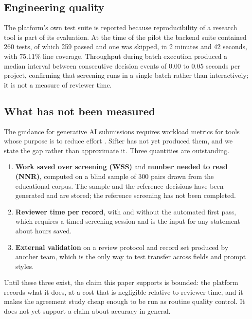 \subsection{Engineering quality}

The platform's own test suite is reported because reproducibility of a
research tool is part of its evaluation. At the time of the pilot the backend
suite contained 260 tests, of which 259 passed and one was skipped, in 2
minutes and 42 seconds, with 75.11\% line coverage. Throughput during batch
execution produced a median interval between consecutive decision events of
0.00 to 0.05 seconds per project, confirming that screening runs in a single
batch rather than interactively; it is not a measure of reviewer time.

\subsection{What has not been measured}\label{sec:planned}

The guidance for generative AI submissions requires workload metrics for tools
whose purpose is to reduce effort \autocite{Farotimi_2025}. Sifter has not yet
produced them, and we state the gap rather than approximate it. Three
quantities are outstanding.

\begin{enumerate}
\item \textbf{Work saved over screening (WSS)} and \textbf{number needed to
read (NNR)}, computed on a blind sample of 300 pairs drawn from the
educational corpus. The sample and the reference decisions have been generated
and are stored; the reference screening has not been completed.
\item \textbf{Reviewer time per record}, with and without the automated first
pass, which requires a timed screening session and is the input for any
statement about hours saved.
\item \textbf{External validation} on a review protocol and record set produced
by another team, which is the only way to test transfer across fields and
prompt styles.
\end{enumerate}

Until these three exist, the claim this paper supports is bounded: the
platform records what it does, at a cost that is negligible relative to
reviewer time, and it makes the agreement study cheap enough to be run as
routine quality control. It does not yet support a claim about accuracy in
general.
